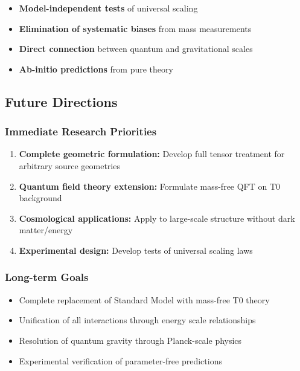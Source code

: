 \documentclass[12pt,a4paper]{article}
\begin{document}
	\begin{itemize}
		\item \textbf{Model-independent tests} of universal scaling
		\item \textbf{Elimination of systematic biases} from mass measurements
		\item \textbf{Direct connection} between quantum and gravitational scales
		\item \textbf{Ab-initio predictions} from pure theory
	\end{itemize}
	
	\subsection{Future Directions}
	\label{subsec:future_directions}
	
	\subsubsection{Immediate Research Priorities}
	
	\begin{enumerate}
		\item \textbf{Complete geometric formulation:} Develop full tensor treatment for arbitrary source geometries
		\item \textbf{Quantum field theory extension:} Formulate mass-free QFT on T0 background
		\item \textbf{Cosmological applications:} Apply to large-scale structure without dark matter/energy
		\item \textbf{Experimental design:} Develop tests of universal scaling laws
	\end{enumerate}
	
	\subsubsection{Long-term Goals}
	
	\begin{itemize}
		\item Complete replacement of Standard Model with mass-free T0 theory
		\item Unification of all interactions through energy scale relationships
		\item Resolution of quantum gravity through Planck-scale physics
		\item Experimental verification of parameter-free predictions
	\end{itemize}
	
\end{document}
